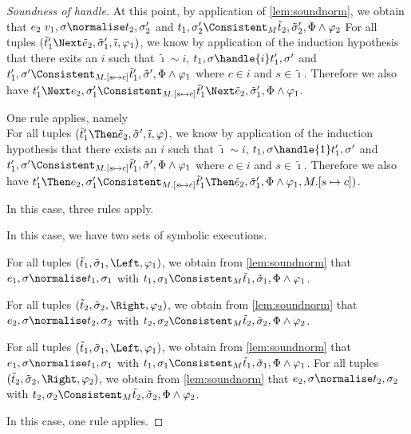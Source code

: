 \begin{proof}[Soundness of handle]
{{At this point, by application of \cref{lem:soundnorm}, we obtain that $e_2\ v_1,\sigma\normalise t_2,\sigma_2'$
and $t_1,\sigma_2'\Consistent_M\tilde{t}_2,\tilde{\sigma}_2',\Phi\land\phi_2$
}
%
{
For all tuples $(\tilde{t}_1'\Next \tilde{e}_2,\tilde{\sigma}_1',\tilde{\imath},\phi_1)$, we know by application of the induction hypothesis that
there exits an $i$ such that $\tilde{\imath}\sim i$, $t_1,\sigma\handle{i}t_1',\sigma'$ and
$t_1',\sigma'\Consistent_{M.[s\mapsto c]}\tilde{t}_1',\tilde{\sigma}',\Phi\land\phi_1$ where $c\in i$ and $s\in \tilde{\imath}$.
Therefore we also have $t_1'\Next e_2,\sigma_1'\Consistent_{M.[s\mapsto c]}\tilde{t}_1'\Next \tilde{e}_2,\tilde{\sigma}_1',\Phi\land\phi_1$.
}
}

{One rule applies, namely \\
For all tuples $(\tilde{t}_1'\Then\tilde{e}_2,\tilde{\sigma}',\tilde{\imath},\phi)$, we know by application of the induction hypothesis that
there exists an $i$ such that $\tilde{\imath}\sim i$, $t_1,\sigma\handle{1}t_1',\sigma'$ and
$t_1',\sigma'\Consistent_{M.[s\mapsto c]}\tilde{t}_1',\tilde{\sigma}',\Phi\land\phi_1$ where $c\in i$ and $s\in \tilde{\imath}$.
Therefore we also have $t_1'\Then e_2,\sigma_1'\Consistent_{M.[s\mapsto c]}\tilde{t}_1'\Then \tilde{e}_2,\tilde{\sigma}_1',\Phi\land\phi_1,M.[s\mapsto c])$.
}

 {
In this case, three rules apply.\\
   {
   In this case, we have two sets of symbolic executions.

   For all tuples $(\tilde{t}_1,\tilde{\sigma}_1,\Left,\phi_1)$,
   we obtain from \cref{lem:soundnorm} that $e_1,\sigma\normalise t_1,\sigma_1$ with
   $t_1,\sigma_1\Consistent_M\tilde{t}_1,\tilde{\sigma}_1,\Phi\land\phi_1$.

   For all tuples $(\tilde{t}_2,\tilde{\sigma}_2,\Right,\phi_2)$,
   we obtain from \cref{lem:soundnorm} that $e_2,\sigma\normalise t_2,\sigma_2$ with
   $t_2,\sigma_2\Consistent_M\tilde{t}_2,\tilde{\sigma}_2,\Phi\land\phi_2$.
   }
%
  {
  For all tuples $(\tilde{t}_1,\tilde{\sigma}_1,\Left,\phi_1)$,
  we obtain from \cref{lem:soundnorm} that $e_1,\sigma\normalise t_1,\sigma_1$ with
  $t_1,\sigma_1\Consistent_M\tilde{t}_1,\tilde{\sigma}_1,\Phi\land\phi_1$.
%
}
  {
  For all tuples $(\tilde{t}_2,\tilde{\sigma}_2,\Right,\phi_2)$,
  we obtain from \cref{lem:soundnorm} that $e_2,\sigma\normalise t_2,\sigma_2$ with
  $t_2,\sigma_2\Consistent_M\tilde{t}_2,\tilde{\sigma}_2,\Phi\land\phi_2$.
  }
 }
%
{
In this case, one rule applies. 

}
\end{proof}
